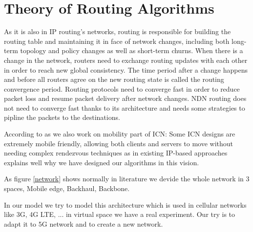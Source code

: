 

\chapter{Theory of Routing Algorithms} %
\label{dash7}


As it is also in IP routing's networks, routing is responsible for building the routing table and maintaining it in face of network changes, including both long-term topology and policy changes as well as short-term churns.  When there is a change in the network, routers need to exchange routing updates with each other in order to reach new global consistency. The time period after a change happens and before all routers agree on the new routing state is called the routing convergence period. Routing protocols need to converge fast in order to reduce packet loss and resume packet delivery after network changes. NDN routing does not need to converge fast thanks to its architecture and needs some strategies to pipline the packets to the destinations.

According to \cite{oran} as we also work on mobility part of ICN: Some ICN designs are extremely mobile friendly, allowing  both  clients  and  servers  to  move  without  needing complex rendezvous techniques as in existing   IP-based approaches explains well why we have designed our algorithms in this vision.

As figure \ref{network} shows normally in literature we devide the whole network in 3 spaces, Mobile edge, Backhaul, Backbone. 

In our model we try to model this architecture which is used in cellular networks like 3G, 4G LTE, ... in virtual space we have a real experiment.
Our try is to adapt it to 5G network and to create a new network.
 



